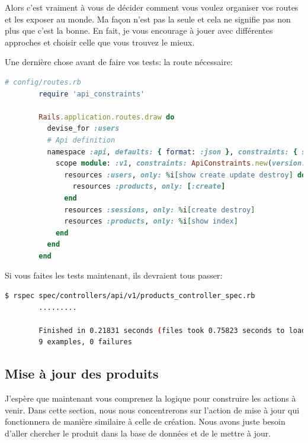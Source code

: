 \documentclass[]{report}
\begin{document}
      Alors c'est vraiment à vous de décider comment vous voulez organiser vos routes et les exposer au monde. Ma façon n'est pas la seule et cela ne signifie pas non plus que c'est la bonne. En fait, je vous encourage à jouer avec différentes approches et choisir celle que vous trouvez le mieux.

      Une dernière chose avant de faire vos tests: la route nécessaire:

      \begin{scriptsize}
        \begin{lstlisting}[language=ruby]
        # config/routes.rb
        require 'api_constraints'

        Rails.application.routes.draw do
          devise_for :users
          # Api definition
          namespace :api, defaults: { format: :json }, constraints: { subdomain: 'api' }, path: '/' do
            scope module: :v1, constraints: ApiConstraints.new(version: 1, default: true) do
              resources :users, only: %i[show create update destroy] do
                resources :products, only: [:create]
              end
              resources :sessions, only: %i[create destroy]
              resources :products, only: %i[show index]
            end
          end
        end
        \end{lstlisting}
      \end{scriptsize}

      Si vous faites les tests maintenant, ils devraient tous passer:

      \begin{scriptsize}
        \begin{lstlisting}[language=bash]
        $ rspec spec/controllers/api/v1/products_controller_spec.rb
        .........

        Finished in 0.21831 seconds (files took 0.75823 seconds to load)
        9 examples, 0 failures
        \end{lstlisting}
      \end{scriptsize}

    \subsection{Mise à jour des produits}

      J'espère que maintenant vous comprenez la logique pour construire les actions à venir. Dans cette section, nous nous concentrerons sur l'action de mise à jour qui fonctionnera de manière similaire à celle de création. Nous avons juste besoin d'aller chercher le produit dans la base de données et de le mettre à jour.
\end{document}
